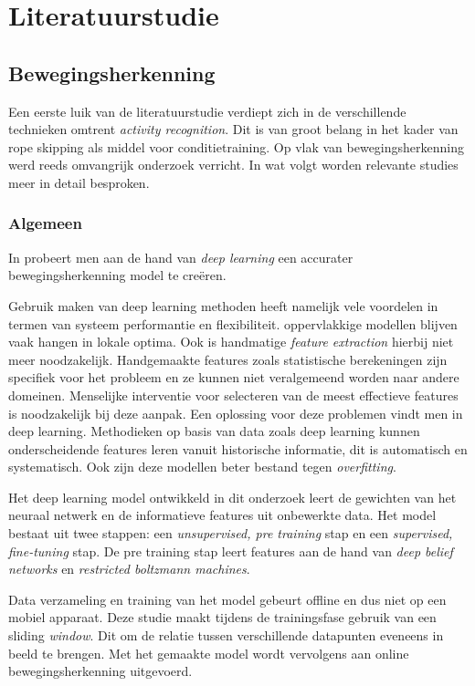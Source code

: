 \chapter{Literatuurstudie}
\section{Bewegingsherkenning}
Een eerste luik van de literatuurstudie verdiept zich in de verschillende technieken omtrent \textit{activity recognition}. Dit is van groot belang in het kader van rope skipping als middel voor conditietraining.
Op vlak van bewegingsherkenning werd reeds omvangrijk onderzoek verricht. In wat volgt worden relevante studies meer in detail besproken. \\

\subsection{Algemeen}

In \citep{ref1} probeert men aan de hand van \textit{deep learning} een accurater bewegingsherkenning model te creëren.

Gebruik maken van deep learning methoden heeft namelijk vele voordelen in termen van systeem performantie en flexibiliteit. oppervlakkige modellen blijven vaak hangen in lokale optima.
Ook is handmatige \textit{feature extraction} hierbij niet meer noodzakelijk. Handgemaakte features zoals statistische berekeningen zijn specifiek voor het probleem en ze kunnen niet veralgemeend worden naar andere domeinen. Menselijke interventie voor selecteren van de meest effectieve features is noodzakelijk bij deze aanpak. 
Een oplossing voor deze problemen vindt men in deep learning. Methodieken op basis van data zoals deep learning kunnen onderscheidende features leren vanuit historische informatie, dit is automatisch en systematisch. Ook zijn deze modellen beter bestand tegen \textit{overfitting}.

Het deep learning model ontwikkeld in dit onderzoek leert de gewichten van het neuraal netwerk en de informatieve features uit onbewerkte data. Het model bestaat uit twee stappen: een \textit{unsupervised, pre training} stap en een \textit{supervised, fine-tuning} stap. De pre training stap leert features aan de hand van \textit{deep belief networks} en \textit{restricted boltzmann machines}.

Data verzameling en training van het model gebeurt offline en dus niet op een mobiel apparaat. Deze studie maakt tijdens de trainingsfase gebruik van een sliding \textit{window}. Dit om de relatie tussen verschillende datapunten eveneens in beeld te brengen.  Met het gemaakte model wordt vervolgens aan online bewegingsherkenning uitgevoerd. 

